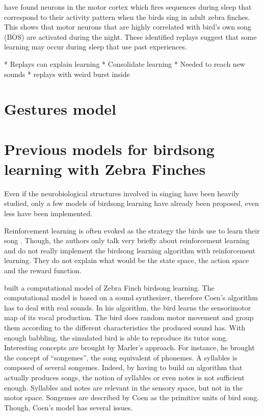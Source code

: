 \documentclass[a4paper]{report}
\begin{document}
\textcite{dave_song_2000} have found neurons in the motor cortex which fires
sequences during sleep that correspond to their activity pattern when the birds
sing in adult zebra finches. This shows that motor neurons that are highly
correlated with bird's own song (BOS) are activated during the night. These
identified replays suggest that some learning may occur during sleep that use
past experiences.

* Replays can explain learning \cite{margoliash_offline_2003}
* Consolidate learning
* Needed to reach new sounds \cite{margoliash_offline_2003}
* replays with weird burst inside \cite{margoliash_evaluating_2002}

\section{Gestures model}

\section{Previous models for birdsong learning with Zebra Finches}

Even if the neurobiological structures involved in singing have been heavily
studied, only a few models of birdsong learning have already been proposed, even
less have been implemented.

Reinforcement learning is often evoked as the strategy the birds use to learn
their song \parencite{dave_song_2000,marler_three_1997}. Though,
the authors only talk very briefly about reinforcement learning and do not
really implement the birdsong learning algorithm with reinforcement learning.
They do not explain what would be the state space, the action space and the
reward function.

\textcite{marler_three_1997} built a computational model of Zebra Finch birdsong
learning. The computational model is based on a sound synthesizer, therefore
Coen's algorithm has to deal with real sounds. In his algorithm, the bird learns
the sensorimotor map of its vocal production. The bird does random motor
movement and group them according to the different characteristics the produced
sound has. With enough babbling, the simulated bird is able to reproduce its
tutor song. Interesting concepts are brought by Marler's approach. For instance,
he brought the concept of ``songemes'', the song equivalent of phonemes. A
syllables is composed of several songemes. Indeed, by having to build an
algorithm that actually produces songs, the notion of syllables or even notes is
not sufficient enough. Syllables and notes are relevant in the sensory space,
but not in the motor space. Songemes are described by Coen as the primitive
units of bird song. Though, Coen's model has several issues.
\end{document}
